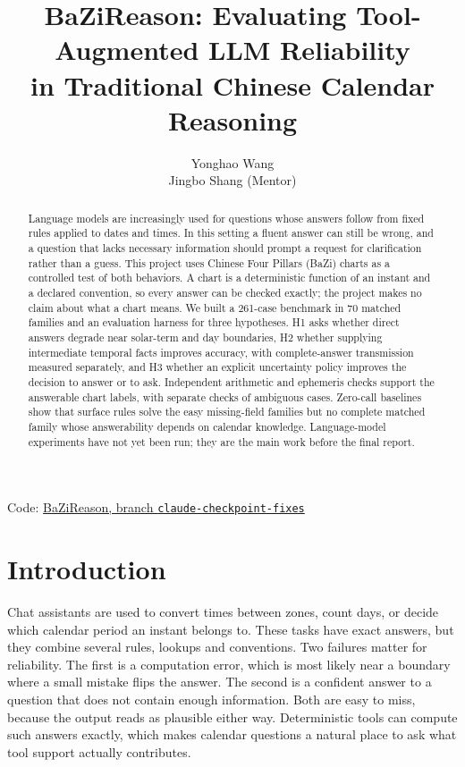 \documentclass[12pt,letterpaper]{article}
\title{BaZiReason: Evaluating Tool-Augmented LLM Reliability\\in Traditional Chinese Calendar Reasoning}
\author{Yonghao Wang \\\And
  Jingbo Shang (Mentor) \\}
\begin{document}
\maketitle

\begin{abstract}
Language models are increasingly used for questions whose answers follow from fixed rules applied to dates and times. In this setting a fluent answer can still be wrong, and a question that lacks necessary information should prompt a request for clarification rather than a guess. This project uses Chinese Four Pillars (BaZi) charts as a controlled test of both behaviors. A chart is a deterministic function of an instant and a declared convention, so every answer can be checked exactly; the project makes no claim about what a chart means. We built a 261-case benchmark in 70 matched families and an evaluation harness for three hypotheses. H1 asks whether direct answers degrade near solar-term and day boundaries, H2 whether supplying intermediate temporal facts improves accuracy, with complete-answer transmission measured separately, and H3 whether an explicit uncertainty policy improves the decision to answer or to ask. Independent arithmetic and ephemeris checks support the answerable chart labels, with separate checks of ambiguous cases. Zero-call baselines show that surface rules solve the easy missing-field families but no complete matched family whose answerability depends on calendar knowledge. Language-model experiments have not yet been run; they are the main work before the final report.
\end{abstract}

\begin{center}
Code: \href{https://github.com/bothermeQAQ/DSC180A-BaZiReason/tree/claude-checkpoint-fixes}{BaZiReason, branch \texttt{claude-checkpoint-fixes}}
\end{center}

\maketoc
\clearpage

\section{Introduction}

Chat assistants are used to convert times between zones, count days, or decide which calendar period an instant belongs to. These tasks have exact answers, but they combine several rules, lookups and conventions. Two failures matter for reliability. The first is a computation error, which is most likely near a boundary where a small mistake flips the answer. The second is a confident answer to a question that does not contain enough information. Both are easy to miss, because the output reads as plausible either way. Deterministic tools can compute such answers exactly, which makes calendar questions a natural place to ask what tool support actually contributes.
\end{document}
